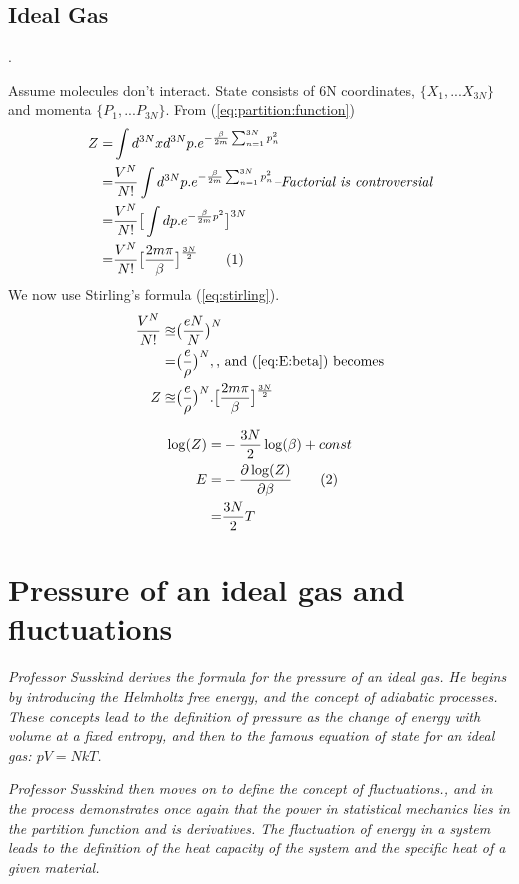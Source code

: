\documentclass[]{article}
\newcommand\numberthis{\addtocounter{equation}{1}\tag{\theequation}}
\begin{document}
\subsection{Ideal Gas}.

Assume molecules don't interact. State consists of 6N coordinates,  $\{X_1,...X_{3N}\}$ and momenta $\{P_1,...P_{3N}\}$. From (\ref{eq:partition:function})
\begin{align*}
Z =& \int d^{3N}x d^{3N}p . e^{- \frac{\beta}{2m} \sum_{n=1}^{3N} p_n^2}\\
=& \frac{V^N}{N!} \int d^{3N}p . e^{- \frac{\beta}{2m} \sum_{n=1}^{3N} p_n^2}\textit{--Factorial is controversial}\\
=& \frac{V^N}{N!} \big[\int dp. e^{-\frac{\beta}{2m}p^2}\big]^{3N}\\
=& \frac{V^N}{N!} \big[\frac{2 m \pi}{\beta}\big]^{\frac{3N}{2}}\numberthis\label{eq:Z_beta}
\end{align*}
We now use Stirling's formula (\ref{eq:stirling}).
\begin{align*}
\frac{V^N}{N!} \approxeq& \big(\frac{eN}{N}\big)^N \\
=& \big(\frac{e}{\rho}\big)^N,\text{, and (\ref{eq:E:beta}) becomes}\\
Z \approxeq& \big(\frac{e}{\rho}\big)^N .  \big[\frac{2 m \pi}{\beta}\big]^{\frac{3N}{2}}
\end{align*}

\begin{align*}
\log(Z) =& - \frac{3N}{2} \log(\beta) + const\\
E =& - \frac{\partial \log(Z)}{\partial \beta}\numberthis \label{eq:E:Z}\\
=& \frac{3N}{2} T
\end{align*}


\section{Pressure of an ideal gas and fluctuations}

\textit{Professor Susskind derives the formula for the pressure of an ideal gas.  He begins by introducing the Helmholtz free energy, and the concept of adiabatic processes.  These concepts lead to the definition of pressure as the change of energy with volume at a fixed entropy, and then to the famous equation of state for an ideal gas:  $pV = NkT$.}

\textit{Professor Susskind then moves on to define the concept of fluctuations., and in the process demonstrates once again that the power in statistical mechanics lies in the partition function and is derivatives.  The fluctuation of energy in a system leads to the definition of the heat capacity of the system and the specific heat of a given material.}
\end{document}
